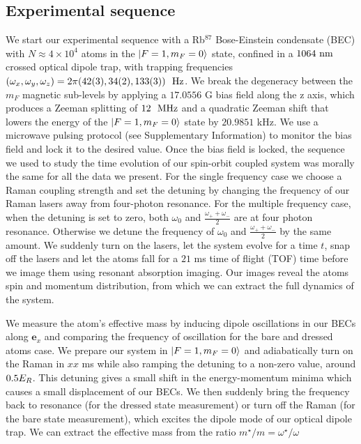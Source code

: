 \subsection{Experimental sequence}


 We start our experimental sequence with a Rb$^{87}$ Bose-Einstein condensate (BEC) with $N\approx 4\times 10^4$ atoms in the $|F=1,m_F=0\rangle$ state, confined in a $1064{\ {\rm nm}}$ crossed optical dipole trap, with trapping frequencies $(\omega_x,\omega_y,\omega_z)=2\pi(42(3),34(2),133(3))\ \Hz$. We break the degeneracy between the $m_F$ magnetic sub-levels by applying a $17.0556$ G bias field along the z axis, which produces a Zeeman splitting of $12 \ {\ {\rm MHz}}$ and a quadratic Zeeman shift that lowers the energy of the $|F=1,m_F=0\rangle$ state  by $20.9851$ kHz. 
We use a microwave pulsing protocol (see Supplementary Information) to monitor the bias field and lock it to the desired value. Once the bias field is locked, the sequence we used to study the time evolution of our spin-orbit coupled system was morally the same for all the data we present. For the single frequency case we choose a Raman coupling strength and set the detuning by changing the frequency of our Raman lasers away from four-photon resonance. For the multiple frequency case, when the detuning is set to zero, both $\omega_0$ and $\frac{\omega_+ + \omega_-}{2}$ are at four photon resonance. Otherwise we detune the frequency of $\omega_0$ and $\frac{\omega_+ +\omega_-}{2}$ by the same amount. We suddenly turn on the lasers, let the system evolve for a time $t$, snap off the lasers and let the atoms fall for a $21$ ms time of flight (TOF) time before we image them using resonant absorption imaging. Our images 
reveal the atoms spin and momentum distribution, from which we can extract the full dynamics of the system.


We measure the atom's effective mass by inducing dipole oscillations in our BECs along $\mathbf{e}_x$ and comparing the frequency of oscillation for the bare and dressed atoms case.  We prepare our system in $|F=1,m_F=0\rangle$ and adiabatically turn on the Raman in $xx$ ms while also ramping the detuning to a non-zero value, around $0.5{{E_R}}$. This detuning gives a small shift in the energy-momentum minima which causes a small displacement of our BECs. We then suddenly bring the frequency back to resonance (for the dressed state measurement) or turn off the Raman (for the bare state measurement), which excites the dipole mode of our optical dipole trap. We can extract the effective mass from the ratio $m^{\star}/m=\omega^{\star}/\omega$




